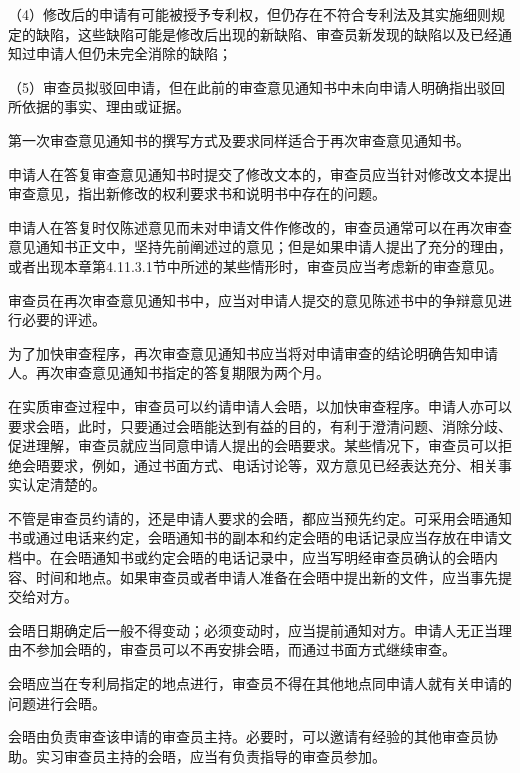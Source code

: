 {\setlength{\parindent}{17.1bp}（4）修改后的申请有可能被授予专利权，但仍存在不符合专利法及其实施细则规定的缺陷，这些缺陷可能是修改后出现的新缺陷、审查员新发现的缺陷以及已经通知过申请人但仍未完全消除的缺陷；\par}

{\setlength{\parindent}{17.1bp}（5）审查员拟驳回申请，但在此前的审查意见通知书中未向申请人明确指出驳回所依据的事实、理由或证据。\par}

第一次审查意见通知书的撰写方式及要求同样适合于再次审查意见通知书。

申请人在答复审查意见通知书时提交了修改文本的，审查员应当针对修改文本提出审查意见，指出新修改的权利要求书和说明书中存在的问题。

申请人在答复时仅陈述意见而未对申请文件作修改的，审查员通常可以在再次审查意见通知书正文中，坚持先前阐述过的意见；但是如果申请人提出了充分的理由，或者出现本章第4.11.3.1节中所述的某些情形时，审查员应当考虑新的审查意见。

审查员在再次审查意见通知书中，应当对申请人提交的意见陈述书中的争辩意见进行必要的评述。

为了加快审查程序，再次审查意见通知书应当将对申请审查的结论明确告知申请人。再次审查意见通知书指定的答复期限为两个月。

在实质审查过程中，审查员可以约请申请人会晤，以加快审查程序。申请人亦可以要求会晤，此时，只要通过会晤能达到有益的目的，有利于澄清问题、消除分歧、促进理解，审查员就应当同意申请人提出的会晤要求。某些情况下，审查员可以拒绝会晤要求，例如，通过书面方式、电话讨论等，双方意见已经表达充分、相关事实认定清楚的。

不管是审查员约请的，还是申请人要求的会晤，都应当预先约定。可采用会晤通知书或通过电话来约定，会晤通知书的副本和约定会晤的电话记录应当存放在申请文档中。在会晤通知书或约定会晤的电话记录中，应当写明经审查员确认的会晤内容、时间和地点。如果审查员或者申请人准备在会晤中提出新的文件，应当事先提交给对方。

会晤日期确定后一般不得变动；必须变动时，应当提前通知对方。申请人无正当理由不参加会晤的，审查员可以不再安排会晤，而通过书面方式继续审查。

会晤应当在专利局指定的地点进行，审查员不得在其他地点同申请人就有关申请的问题进行会晤。

会晤由负责审查该申请的审查员主持。必要时，可以邀请有经验的其他审查员协助。实习审查员主持的会晤，应当有负责指导的审查员参加。

